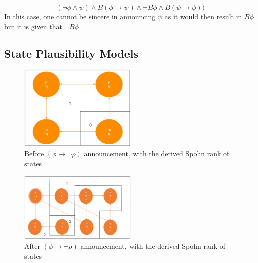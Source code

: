 \documentclass[12pt, titlepage, twoside, a4paper]{report}
\begin{document}
{$$(\neg \phi \wedge \psi) \wedge B(\phi \to \psi) \wedge \neg B \phi \wedge B(\psi \to \phi))$$
In this case, one cannot be sincere in announcing $\psi$ as it would then result in $B\phi$ but it is given that $\neg B \phi$

\subsection{State Plausibility Models}
\quad
\newline
\begin{figure}[h!]
  \centering
  \includegraphics[width=0.5\textwidth]{slide34.eps}
  \caption{Before $(\phi \to \neg \rho)$ announcement, with the derived Spohn rank of states}
\end{figure}
\begin{figure}[h!]
  \centering
  \includegraphics[width=0.5\textwidth]{slide36.eps}
  \caption{After $(\phi \to \neg \rho)$ announcement, with the derived Spohn rank of states}
\end{figure}
\quad
\newline

}
\end{document}
